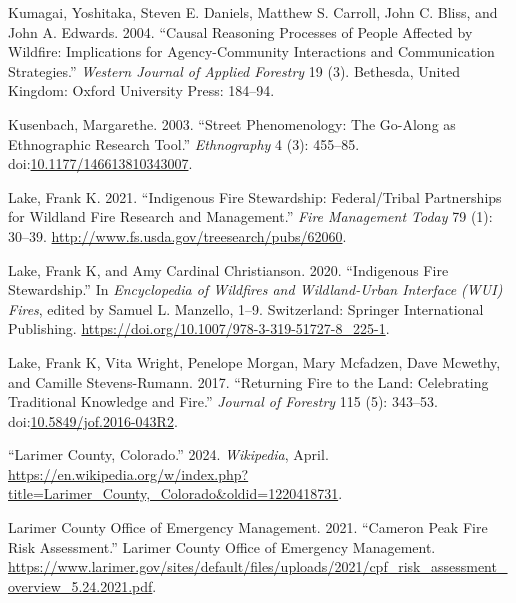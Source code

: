 \documentclass[
]{article}
\newlength{\cslhangindent}
\newenvironment{CSLReferences}[2] %
 {\begin{list}{}{%
  \setlength{\itemindent}{0pt}
  \setlength{\leftmargin}{0pt}
  \setlength{\parsep}{0pt}
  \ifodd #1
   \setlength{\leftmargin}{\cslhangindent}
   \setlength{\itemindent}{-1\cslhangindent}
  \fi
  \setlength{\itemsep}{#2\baselineskip}}}
 {\end{list}}
\begin{document}
\begin{CSLReferences}{1}{0}
Kumagai, Yoshitaka, Steven E. Daniels, Matthew S. Carroll, John C. Bliss, and John A. Edwards. 2004. {``Causal {Reasoning Processes} of {People Affected} by {Wildfire}: {Implications} for {Agency-Community Interactions} and {Communication Strategies}.''} \emph{Western Journal of Applied Forestry} 19 (3). Bethesda, United Kingdom: Oxford University Press: 184--94.

Kusenbach, Margarethe. 2003. {``Street {Phenomenology}: {The Go-Along} as {Ethnographic Research Tool}.''} \emph{Ethnography} 4 (3): 455--85. doi:\href{https://doi.org/10.1177/146613810343007}{10.1177/146613810343007}.

Lake, Frank K. 2021. {``Indigenous Fire Stewardship: {Federal}/{Tribal} Partnerships for Wildland Fire Research and Management.''} \emph{Fire Management Today} 79 (1): 30--39. \url{http://www.fs.usda.gov/treesearch/pubs/62060}.

Lake, Frank K, and Amy Cardinal Christianson. 2020. {``Indigenous {Fire Stewardship}.''} In \emph{Encyclopedia of {Wildfires} and {Wildland-Urban Interface} ({WUI}) {Fires}}, edited by Samuel L. Manzello, 1--9. Switzerland: Springer International Publishing. \url{https://doi.org/10.1007/978-3-319-51727-8_225-1}.

Lake, Frank K, Vita Wright, Penelope Morgan, Mary Mcfadzen, Dave Mcwethy, and Camille Stevens-Rumann. 2017. {``Returning {Fire} to the {Land}: {Celebrating Traditional Knowledge} and {Fire}.''} \emph{Journal of Forestry} 115 (5): 343--53. doi:\href{https://doi.org/10.5849/jof.2016-043R2}{10.5849/jof.2016-043R2}.

{``Larimer {County}, {Colorado}.''} 2024. \emph{Wikipedia}, April. \url{https://en.wikipedia.org/w/index.php?title=Larimer_County,_Colorado&oldid=1220418731}.

Larimer County Office of Emergency Management. 2021. {``Cameron {Peak Fire Risk Assessment}.''} Larimer County Office of Emergency Management. \url{https://www.larimer.gov/sites/default/files/uploads/2021/cpf_risk_assessment_overview_5.24.2021.pdf}.


\end{CSLReferences}
\end{document}
